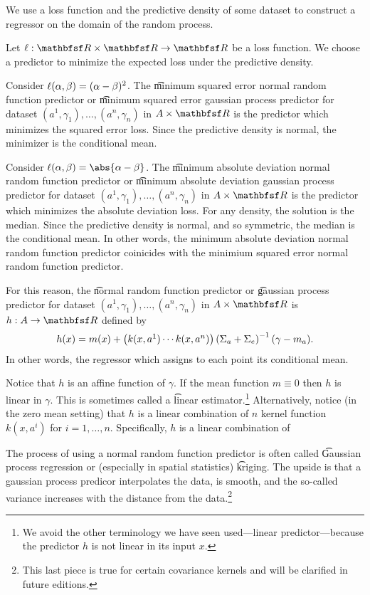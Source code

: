 

We use a loss function and the predictive density of some dataset to construct a regressor on the domain of the random process.


Let $\ell: \R \times \R \to \R$ be a loss function.
We choose a predictor to minimize the expected loss under the predictive density.

Consider $\ell(\alpha, \beta) = (\alpha - \beta)^2$.
The \t{minimum squared error normal random function predictor} or \t{minimum squared error gaussian process predictor} for dataset $(a^1, \gamma_1), \dots, (a^n, \gamma_n)$ in $A \times \R$ is the predictor which minimizes the squared error loss.
Since the predictive density is normal, the minimizer is the conditional mean.

Consider $\ell(\alpha, \beta) = \abs{\alpha - \beta}$.
The \t{minimum absolute deviation normal random function predictor} or \t{minimum absolute deviation gaussian process predictor} for dataset $(a^1, \gamma_1), \dots, (a^n, \gamma_n)$ in $A \times \R$ is the predictor which minimizes the absolute deviation loss.
For any density, the solution is the median.
Since the predictive density is normal, and so symmetric, the median is the conditional mean.
In other words, the minimum absolute deviation normal random function predictor coinicides with the minimium squared error normal random function predictor.


For this reason, the \t{normal random function predictor} or \t{gaussian process predictor} for dataset $(a^1, \gamma_1), \dots, (a^n, \gamma_n)$ in $A \times \R$ is $h: A \to \R$ defined by
\[
  h(x) = m(x) + \begin{pmatrix}k(x,a^1) \cdots k(x, a^n)\end{pmatrix}\left(\Sigma_{a} + \Sigma_{e}\right)^{-1}(\gamma - m_{a}).
\]
In other words, the regressor which assigns to each point its conditional mean.

Notice that $h$ is an affine function of $\gamma$.
If the mean function $m \equiv 0$ then $h$ is linear in $\gamma$.
This is sometimes called a \t{linear estimator}.\footnote{We avoid the other terminology we have seen used---linear predictor---because the predictor $h$ is not linear in its input $x$.}
Alternatively, notice (in the zero mean setting) that $h$ is a linear combination of $n$ kernel function $k(x, a^i)$ for $i = 1, \dots, n$.
Specifically, $h$ is a linear combination of

The process of using a normal random function predictor is often called \t{Gaussian process regression} or (especially in spatial statistics) \t{kriging}.
The upside is that a gaussian process predicor interpolates the data, is smooth, and the so-called variance increases with the distance from the data.\footnote{This last piece is true for certain covariance kernels and will be clarified in future editions.}
